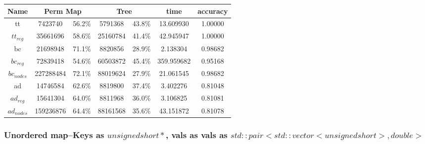 \documentclass[]{article}
\begin{document}
\begin{center}
\begin{tabular} { |c|c|c|c|c|c|c| }
\hline
Name & \multicolumn{2}{c|}{Perm Map} & \multicolumn{2}{c|}{Tree} & time & accuracy \\
\hline

tt & 7423740 & 56.2\%  & 5791368 & 43.8\% & 13.609930 & 1.00000 \\

$tt_{reg}$ & 35661696 & 58.6\% & 25160784 & 41.4\% & 42.945947 & 1.00000 \\

bc & 21698948 & 71.1\% & 8820856 & 28.9\% & 2.138304 & 0.98682 \\

$bc_{reg}$ & 72839418 & 54.6\% & 60503872 & 45.4\% & 359.959682 & 0.95168 \\

$bc_{nodes}$ & 227288484 & 72.1\% & 88019624 & 27.9\% & 21.061545 & 0.98682 \\

ad & 14746584 & 62.6\% & 8819800 & 37.4\% & 3.402276 & 0.81048 \\

$ad_{reg}$ & 15641304 & 64.0\% & 8811968 & 36.0\% & 3.106825 & 0.81081 \\

$ad_{nodes}$ & 159236876 & 64.4\% & 88161568 & 35.6\% & 43.151872 & 0.81078 \\
\hline
\end{tabular}
\end{center}

\subsubsection{Unordered map--Keys as $unsigned short *$, vals as vals as $std::pair<std::vector<unsigned short>, double>$}
\end{document}
